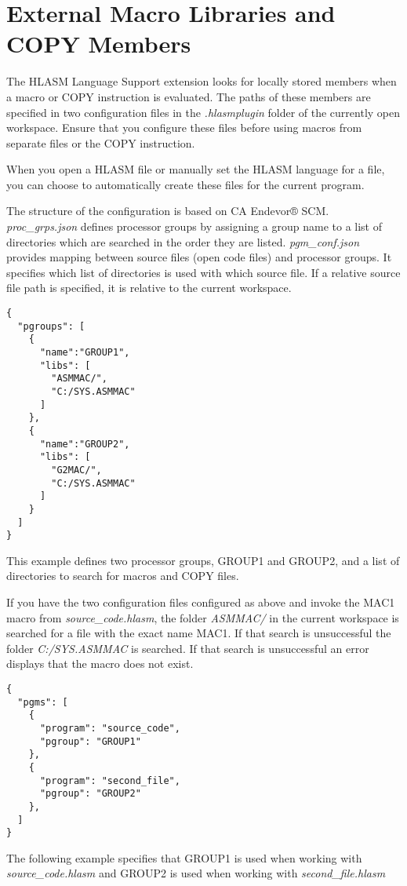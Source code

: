 \chapter{External Macro Libraries and COPY Members}
\label{chap:configuration}

The HLASM Language Support extension looks for locally stored members when a macro or COPY instruction is evaluated. The paths of these members are specified in two configuration files in the \emph{.hlasmplugin} folder of the currently open workspace. Ensure that you configure these files before using macros from separate files or the COPY instruction.

When you open a HLASM file or manually set the HLASM language for a file, you can choose to automatically create these files for the current program.

The structure of the configuration is based on CA Endevor® SCM. \emph{proc\_grps.json} defines processor groups by assigning a group name to a list of directories which are searched in the order they are listed. \emph{pgm\_conf.json} provides mapping between source files (open code files) and processor groups. It specifies which list of directories is used with which source file. If a relative source file path is specified, it is relative to the current workspace.

\begin{listing}[H]
	\begin{verbatim}
{
  "pgroups": [
    {
      "name":"GROUP1",
      "libs": [
        "ASMMAC/",
        "C:/SYS.ASMMAC"
      ]
    },
    {
      "name":"GROUP2",
      "libs": [
        "G2MAC/",
        "C:/SYS.ASMMAC"
      ]
    }
  ]
}
	\end{verbatim}
	\caption{This example defines two processor groups, GROUP1 and GROUP2, and a list of directories to search for macros and COPY files.}
\end{listing}

If you have the two configuration files configured as above and invoke the MAC1 macro from \emph{source\_code.hlasm}, the folder \emph{ASMMAC/} in the current workspace is searched for a file with the exact name MAC1. If that search is unsuccessful the folder \emph{C:/SYS.ASMMAC} is searched. If that search is unsuccessful an error displays that the macro does not exist.

\begin{listing}[H]
	\begin{verbatim}
{
  "pgms": [
    {
      "program": "source_code",
      "pgroup": "GROUP1"
    },
    {
      "program": "second_file",
      "pgroup": "GROUP2"
    },
  ]
}
	\end{verbatim}
	\caption{The following example specifies that GROUP1 is used when working with \emph{source\_code.hlasm} and GROUP2 is used when working with \emph{second\_file.hlasm}}
\end{listing}

